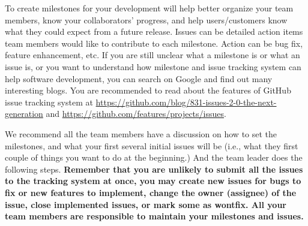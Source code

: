 To create milestones for your development will help better organize your team
members, know your collaborators' progress, and help users/customers know what
they could expect from a future release. Issues can be detailed action items
team members would like to contribute to each milestone. Action can be bug fix,
feature enhancement, etc. If you are still unclear what a milestone is or what
an issue is, or you want to understand how milestone and issue tracking system
can help software development, you can search on Google and find out many
interesting blogs. You are recommended to read about the features of GitHub
issue tracking system at
\url{https://github.com/blog/831-issues-2-0-the-next-generation} and
\url{https://github.com/features/projects/issues}.

We recommend all the team members have a discussion on how to set the
milestones, and what your first several initial issues will be (i.e., what they
first couple of things you want to do at the beginning.) And the team leader
does the following steps. \textbf{Remember that you are unlikely to submit all
the issues to the tracking system at once, you may create new issues for bugs to
fix or new features to implement, change the owner (assignee) of the issue,
close implemented issues, or mark some as wontfix. All your team members
are responsible to maintain your milestones and issues.}

